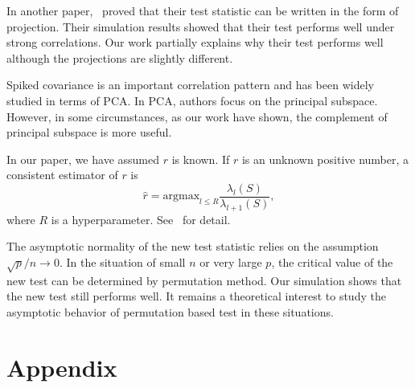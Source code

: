 \documentclass[review]{elsarticle}
\theoremstyle{plain}
\newtheorem{lemma}{\quad\quad Lemma}
\theoremstyle{definition}
\theoremstyle{remark}
\begin{document}

In another paper,~\cite{Zhao2016A} proved that their test statistic can be written in the form of projection. Their simulation results showed that their test performs well under strong correlations.
Our work partially explains why their test performs well although the projections are slightly different. 

 Spiked covariance is an important correlation pattern and has been widely studied in terms of PCA\@.
 In PCA, authors focus on the principal subspace.
 However, in some circumstances, as our work have shown, the complement of principal subspace is more useful. 

In our paper, we have assumed $r$ is known. If $r$ is an unknown positive number, a consistent estimator of $r$ is
\begin{equation}\label{estimateR}
    \hat{r}=\textrm{argmax}_{l\leq R}\frac{\lambda_l(S)}{\lambda_{l+1}(S)},
\end{equation}
where $R$ is a hyperparameter.
    See~\cite{Ahn2009Eigenvalue} for detail.


The asymptotic normality of the new test statistic relies on the assumption $\sqrt{p}/n\to 0$. In the situation of small $n$ or very large $p$, the critical value of the new test can be determined by permutation method. Our simulation shows that the new test still performs well. It remains a theoretical interest to study the asymptotic behavior of permutation based test in these situations.



\section*{Appendix}

\end{document}
